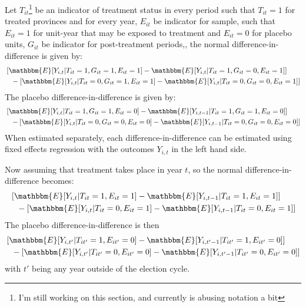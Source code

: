 \documentclass[12pt]{article}\usepackage[]{graphicx}\usepackage[]{color}
\newcommand{\1}{\mathbbm{1}}
\renewcommand\r{\right}
\renewcommand\l{\left}
\newcommand\E{\mathbbm{E}}
\begin{document}
Let $T_{it}$\footnote{I'm still working on this section, and currently is abusing notation a bit} be an indicator of treatment status in every period such that $T_{it} = 1$ for treated provinces and for every year, $E_{it}$ be indicator for sample, such that $E_{it} = 1 $ for unit-year that may be exposed to treatment and $E_{it} = 0$ for placebo units, $G_{it}$ be indicator for post-treatment periods,, the normal difference-in-difference is given by:
	\begin{align*}
		& \l[\E[Y_{i,t} | T_{it}=1, G_{it}=1, E_{it}=1] - \E[Y_{i,t} | T_{it}=1, G_{it}=0, E_{it}=1]\r] \\
		&\phantom{=} - \l[\E[Y_{i,t} | T_{it}=0, G_{it}=1, E_{it}=1] - \E[Y_{i,t} | T_{it}=0, G_{it}=0, E_{it}=1]\r]
	\end{align*}
The placebo difference-in-difference is given by:
	\begin{align*}
		&\l[\E[Y_{i,t} | T_{it}=1, G_{it}=1, E_{it}=0] - \E[Y_{i,t-1} | T_{it}=1, G_{it}=1, E_{it}=0]\r] \\
		&\phantom{=} - \l[\E[Y_{i,t} | T_{it}=0, G_{it}=0, E_{it}=0] - \E[Y_{i,t-1} | T_{it}=0, G_{it}=0, E_{it}=0]\r]
	\end{align*}
When estimated separately, each difference-in-difference can be estimated using fixed effects regression with the outcomes $Y_{i,t}$ in the left hand side.

Now assuming that treatment takes place in year $t$, so the normal difference-in-difference becomes:
	\begin{align*}
		& \l[\E[Y_{i,t} | T_{it}=1, E_{it}=1] - \E[Y_{i,t-1} | T_{it}=1, E_{it}=1]\r] \\
		&\phantom{=} - \l[\E[Y_{i,t} | T_{it}=0, E_{it}=1] - \E[Y_{i,t-1} | T_{it}=0, E_{it}=1]\r]
	\end{align*}
The placebo difference-in-difference is then 
	\begin{align*}
		& \l[\E[Y_{i,t'} | T_{it'}=1, E_{it'}=0] - \E[Y_{i,t'-1} | T_{it'}=1, E_{it'}=0]\r] \\
		&\phantom{=} - \l[\E[Y_{i,t'} | T_{it'}=0, E_{it'}=0] - \E[Y_{i,t'-1} | T_{it'}=0, E_{it'}=0]\r]
	\end{align*}
with $t'$ being any year outside of the election cycle.
\end{document}

